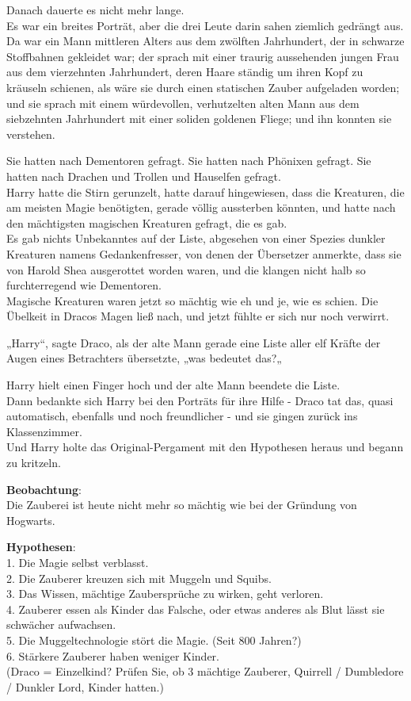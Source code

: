{Danach dauerte es nicht mehr lange.\\ Es war ein breites Porträt, aber die drei Leute darin sahen ziemlich gedrängt aus. Da war ein Mann mittleren Alters aus dem zwölften Jahrhundert, der in schwarze Stoffbahnen gekleidet war; der sprach mit einer traurig aussehenden jungen Frau aus dem vierzehnten Jahrhundert, deren Haare ständig um ihren Kopf zu kräuseln schienen, als wäre sie durch einen statischen Zauber aufgeladen worden; und sie sprach mit einem würdevollen, verhutzelten alten Mann aus dem siebzehnten Jahrhundert mit einer soliden goldenen Fliege; und ihn konnten sie verstehen.

Sie hatten nach Dementoren gefragt. Sie hatten nach Phönixen gefragt. Sie hatten nach Drachen und Trollen und Hauselfen gefragt.\\ Harry hatte die Stirn gerunzelt, hatte darauf hingewiesen, dass die Kreaturen, die am meisten Magie benötigten, gerade völlig aussterben könnten, und hatte nach den mächtigsten magischen Kreaturen gefragt, die es gab.\\ Es gab nichts Unbekanntes auf der Liste, abgesehen von einer Spezies dunkler Kreaturen namens Gedankenfresser, von denen der Übersetzer anmerkte, dass sie von Harold Shea ausgerottet worden waren, und die klangen nicht halb so furchterregend wie Dementoren.\\ Magische Kreaturen waren jetzt so mächtig wie eh und je, wie es schien. Die Übelkeit in Dracos Magen ließ nach, und jetzt fühlte er sich nur noch verwirrt.

„Harry“, sagte Draco, als der alte Mann gerade eine Liste aller elf Kräfte der Augen eines Betrachters übersetzte, „was bedeutet das?„

Harry hielt einen Finger hoch und der alte Mann beendete die Liste.\\ Dann bedankte sich Harry bei den Porträts für ihre Hilfe - Draco tat das, quasi automatisch, ebenfalls und noch freundlicher - und sie gingen zurück ins Klassenzimmer.\\ Und Harry holte das Original-Pergament mit den Hypothesen heraus und begann zu kritzeln.

\textbf{Beobachtung}:\\ Die Zauberei ist heute nicht mehr so mächtig wie bei der Gründung von Hogwarts.

\textbf{Hypothesen}:\\ 1. Die Magie selbst verblasst.\\ 2. Die Zauberer kreuzen sich mit Muggeln und Squibs.\\ 3. Das Wissen, mächtige Zaubersprüche zu wirken, geht verloren.\\ 4. Zauberer essen als Kinder das Falsche, oder etwas anderes als Blut lässt sie schwächer aufwachsen.\\ 5. Die Muggeltechnologie stört die Magie. (Seit 800 Jahren?)\\ 6. Stärkere Zauberer haben weniger Kinder.\\ (Draco = Einzelkind? Prüfen Sie, ob 3 mächtige Zauberer, Quirrell / Dumbledore / Dunkler Lord, Kinder hatten.)

}
